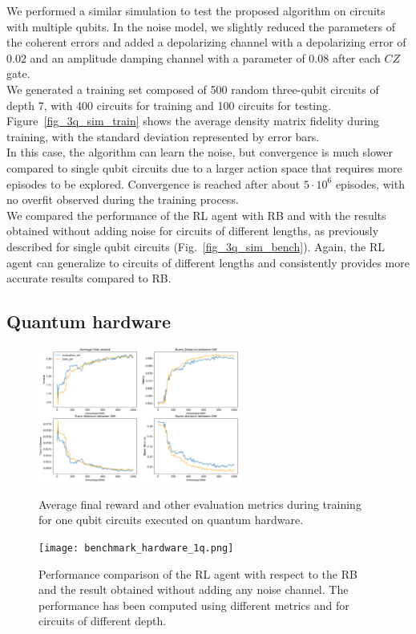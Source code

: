 \documentclass[referee,sn-basic]{sn-jnl} %
\begin{document}
\noindent
We performed a similar simulation to test the proposed algorithm on circuits with multiple qubits. 
In the noise model, we slightly reduced the parameters of the coherent errors and added a depolarizing 
channel with a depolarizing error of $0.02$ and an amplitude damping channel with a parameter of $0.08$ 
after each $CZ$ gate. \\
We generated a training set composed of 500 random three-qubit circuits of depth 7, with 400 circuits 
for training and 100 circuits for testing. Figure~\ref{fig_3q_sim_train} shows the average density matrix 
fidelity during training, with the standard deviation represented by error bars.\\
In this case, the algorithm can learn the noise, but convergence is much slower compared to single qubit 
circuits due to a larger action space that requires more episodes to be explored. Convergence is reached 
after about $5\cdot10^6$ episodes, with no overfit observed during the training process.\\
We compared the performance of the RL agent with RB and with the results obtained without adding noise for 
circuits of different lengths, as previously described for single qubit circuits (Fig.~\ref{fig_3q_sim_bench}). 
Again, the RL agent can generalize to circuits of different lengths and consistently provides more accurate 
results compared to RB.

\subsection{Quantum hardware}\label{sec_hardware}

\begin{figure}
    \centering
    \includegraphics[width=0.6\textwidth]{training_hardware_1q.png}
    \caption{Average final reward and other evaluation metrics during training for one qubit circuits 
    executed on quantum hardware.}\label{fig_1q_hard_train}
    \texttt{[image: benchmark\_hardware\_1q.png]}
    \caption{Performance comparison of the RL agent with respect to the RB and the result obtained 
    without adding any noise channel. The performance has been computed using different metrics and 
    for circuits of different depth.}\label{fig_1q_hard_bench}
\end{figure}
\end{document}
